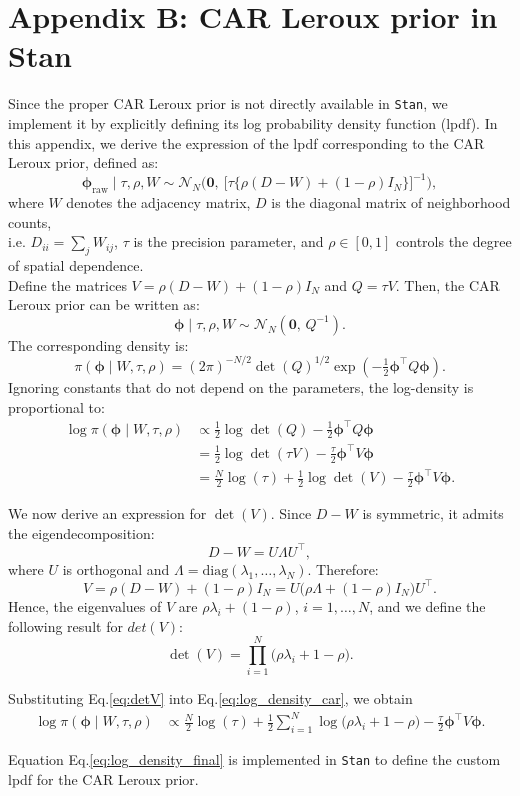 \newpage
\section*{Appendix B: CAR Leroux prior in Stan}\label{ann:lpdf_car}

Since the proper CAR Leroux prior is not directly available in \texttt{Stan}, we implement it by explicitly defining its log probability density function (lpdf). In this appendix, we derive the expression of the lpdf corresponding to the CAR Leroux prior, defined as:
\[
\boldsymbol{\phi}_{\mathrm{raw}} \mid \tau,\rho,W
\sim \mathcal{N}_N\!\Big(
\mathbf{0},\ 
\big[\tau\{\rho(D-W)+(1-\rho)I_N\}\big]^{-1}
\Big),
\]
where $W$ denotes the adjacency matrix, $D$ is the diagonal matrix of neighborhood counts,\\
i.e. $D_{ii}=\sum_j W_{ij}$, $\tau$ is the precision parameter, and $\rho\in[0,1]$ controls the degree of spatial dependence.\\

Define the matrices $V=\rho(D-W)+(1-\rho)I_N$ and $Q=\tau V$.
Then, the CAR Leroux prior can be written as:
\[
\boldsymbol{\phi} \mid \tau,\rho,W
\sim \mathcal{N}_N\!\left(\mathbf{0},\, Q^{-1}\right).
\]
The corresponding density is:
\[
\pi(\boldsymbol{\phi} \mid W,\tau,\rho)
= (2\pi)^{-N/2}\det(Q)^{1/2}
\exp\!\left(-\tfrac12 \boldsymbol{\phi}^\top Q \boldsymbol{\phi}\right).
\]
Ignoring constants that do not depend on the parameters, the log-density is proportional to:
\begin{align}
\log \pi(\boldsymbol{\phi} \mid W,\tau,\rho)
&\propto \tfrac12 \log \det(Q)
- \tfrac12 \boldsymbol{\phi}^\top Q \boldsymbol{\phi} \nonumber\\
&= \tfrac12 \log \det(\tau V)
- \tfrac{\tau}{2}\boldsymbol{\phi}^\top V \boldsymbol{\phi} \nonumber\\
&= \tfrac{N}{2}\log(\tau)
+ \tfrac12 \log \det(V)
- \tfrac{\tau}{2}\boldsymbol{\phi}^\top V \boldsymbol{\phi}.
\label{eq:log_density_car}
\end{align}

We now derive an expression for $\det(V)$.
Since $D-W$ is symmetric, it admits the eigendecomposition:
\[
D-W = U \Lambda U^\top,
\]
where $U$ is orthogonal and $\Lambda=\mathrm{diag}(\lambda_1,\dots,\lambda_N)$.
Therefore:
\[
V=\rho(D-W)+(1-\rho)I_N
=U\big(\rho\Lambda+(1-\rho)I_N\big)U^\top.
\]
Hence, the eigenvalues of $V$ are $\rho\lambda_i+(1-\rho)$, $i=1,\dots,N$, and we define the following result for $det(V)$:
\begin{equation}
\det(V)
= \prod_{i=1}^N \big(\rho\lambda_i + 1-\rho\big).
\label{eq:detV}
\end{equation}

Substituting Eq.\eqref{eq:detV} into Eq.\eqref{eq:log_density_car}, we obtain
\begin{align}
\log \pi(\boldsymbol{\phi} \mid W,\tau,\rho)
&\propto
\tfrac{N}{2}\log(\tau)
+ \tfrac12 \sum_{i=1}^N \log\big(\rho\lambda_i + 1-\rho\big)
- \tfrac{\tau}{2}\boldsymbol{\phi}^\top V \boldsymbol{\phi}.
\label{eq:log_density_final}
\end{align}

Equation Eq.\eqref{eq:log_density_final} is implemented in \texttt{Stan} to define the custom lpdf for the CAR Leroux prior.
